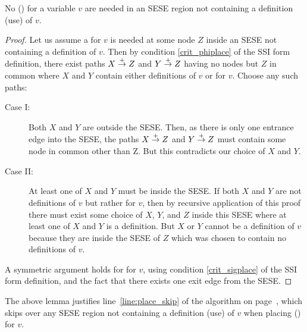 \documentclass[12pt,titlepage,twoside]{article}
\begin{document}
\begin{lemma}\label{lem:sese_child}
No  () for a variable $v$ are needed in
an SESE region not containing a definition (use) of $v$.
\end{lemma}
\begin{proof}
Let us assume a \phifunction for $v$ is needed at some node $Z$
inside an SESE not containing a definition of $v$.  
Then by condition \ref{crit_phiplace} of the SSI
form definition, there exist paths $X \stackrel{+}{\rightarrow} Z$ and $Y \stackrel{+}{\rightarrow} Z$
having no nodes but $Z$ in common where $X$ and $Y$ contain either
definitions of $v$ or  for $v$.  Choose any such
paths:
\begin{description}
\item[Case I:] Both $X$ and $Y$ are outside the SESE.  Then, as there
is only one entrance edge into the SESE, the paths $X \stackrel{+}{\rightarrow} Z$ and
$Y \stackrel{+}{\rightarrow} Z$ must contain some node in common other than Z.  But
this contradicts our choice of $X$ and $Y$.
\item[Case II:] At least one of $X$ and $Y$ must be inside the SESE.
If both $X$ and $Y$ are not definitions of $v$ but rather
 for $v$, then by recursive application of this proof
there must exist some choice of $X$, $Y$, and $Z$ inside this SESE
where at least one of $X$ and $Y$ is a definition.  But $X$ or $Y$
cannot be a definition of $v$ because they are inside the SESE of $Z$ which
was chosen to contain no definitions of $v$.
\end{description}

A symmetric argument holds for  for $v$, using
condition \ref{crit_sigplace} of the SSI form definition, and the fact
that there exists one exit edge from the SESE.
\end{proof}

The above lemma justifies line~\ref{line:place_skip} of the algorithm
on page~\pageref{line:place_skip}, which skips over any SESE region
not containing a definition (use) of $v$ when placing
 () for $v$.
\end{document}
